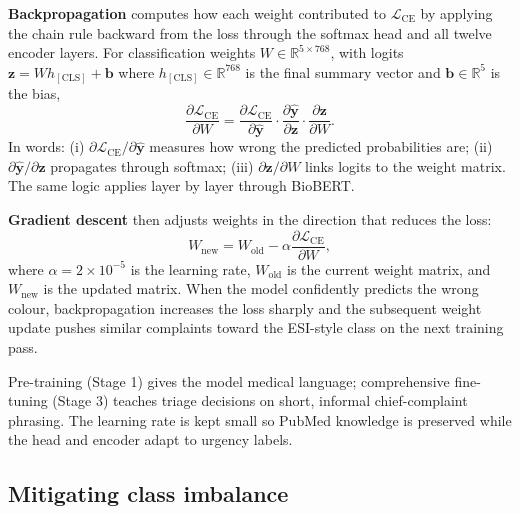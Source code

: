 \textbf{Backpropagation} computes how each weight contributed to \(\mathcal{L}_{\mathrm{CE}}\) by applying the chain rule backward from the loss through the softmax head and all twelve encoder layers. For classification weights \(W \in \mathbb{R}^{5 \times 768}\), with logits \(\mathbf{z} = W h_{\mathrm{[CLS]}} + \mathbf{b}\) where \(h_{\mathrm{[CLS]}} \in \mathbb{R}^{768}\) is the final summary vector and \(\mathbf{b} \in \mathbb{R}^{5}\) is the bias,
\begin{equation}
  \frac{\partial \mathcal{L}_{\mathrm{CE}}}{\partial W} = \frac{\partial \mathcal{L}_{\mathrm{CE}}}{\partial \hat{\mathbf{y}}} \cdot \frac{\partial \hat{\mathbf{y}}}{\partial \mathbf{z}} \cdot \frac{\partial \mathbf{z}}{\partial W}.
\end{equation}
In words: (i) \(\partial \mathcal{L}_{\mathrm{CE}}/\partial \hat{\mathbf{y}}\) measures how wrong the predicted probabilities are; (ii) \(\partial \hat{\mathbf{y}}/\partial \mathbf{z}\) propagates through softmax; (iii) \(\partial \mathbf{z}/\partial W\) links logits to the weight matrix. The same logic applies layer by layer through BioBERT.

\textbf{Gradient descent} then adjusts weights in the direction that reduces the loss:
\begin{equation}
  W_{\mathrm{new}} = W_{\mathrm{old}} - \alpha \frac{\partial \mathcal{L}_{\mathrm{CE}}}{\partial W},
\end{equation}
where \(\alpha = 2 \times 10^{-5}\) is the learning rate, \(W_{\mathrm{old}}\) is the current weight matrix, and \(W_{\mathrm{new}}\) is the updated matrix. When the model confidently predicts the wrong colour, backpropagation increases the loss sharply and the subsequent weight update pushes similar complaints toward the ESI-style class on the next training pass.

\begin{remark}
Pre-training (Stage 1) gives the model medical language; comprehensive fine-tuning (Stage 3) teaches triage decisions on short, informal chief-complaint phrasing. The learning rate is kept small so PubMed knowledge is preserved while the head and encoder adapt to urgency labels.
\end{remark}

\subsection{Mitigating class imbalance}
\label{sec:imbalance-mitigation}

